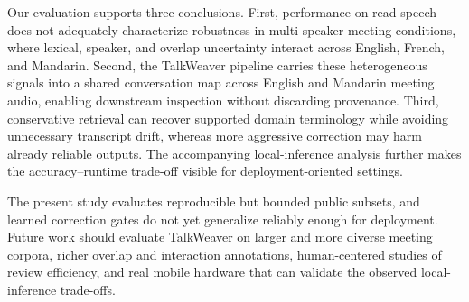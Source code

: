 \documentclass[10pt,twocolumn]{article}
\begin{document}
Our evaluation supports three conclusions. First, performance on read speech does not adequately characterize robustness in multi-speaker meeting conditions, where lexical, speaker, and overlap uncertainty interact across English, French, and Mandarin. Second, the TalkWeaver pipeline carries these heterogeneous signals into a shared conversation map across English and Mandarin meeting audio, enabling downstream inspection without discarding provenance. Third, conservative retrieval can recover supported domain terminology while avoiding unnecessary transcript drift, whereas more aggressive correction may harm already reliable outputs. The accompanying local-inference analysis further makes the accuracy--runtime trade-off visible for deployment-oriented settings.

The present study evaluates reproducible but bounded public subsets, and learned correction gates do not yet generalize reliably enough for deployment. Future work should evaluate TalkWeaver on larger and more diverse meeting corpora, richer overlap and interaction annotations, human-centered studies of review efficiency, and real mobile hardware that can validate the observed local-inference trade-offs.



\raggedbottom



\clearpage
\flushbottom
\appendix

\end{document}
